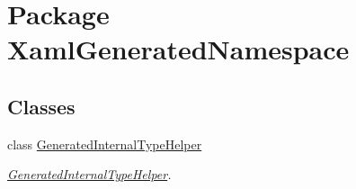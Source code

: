 \hypertarget{namespace_xaml_generated_namespace}{
\section{Package XamlGeneratedNamespace}
\label{namespace_xaml_generated_namespace}
}
\subsection*{Classes}
\begin{DoxyCompactItemize}
\item 
class \hyperlink{class_xaml_generated_namespace_1_1_generated_internal_type_helper}{GeneratedInternalTypeHelper}
\begin{DoxyCompactList}\small\item\em \hyperlink{class_xaml_generated_namespace_1_1_generated_internal_type_helper}{GeneratedInternalTypeHelper}. \item\end{DoxyCompactList}\end{DoxyCompactItemize}
